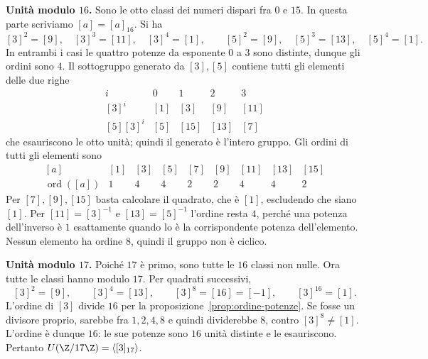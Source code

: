 \begin{svolgimento}
\textbf{Unità modulo $16$.} Sono le otto classi dei numeri dispari fra $0$ e $15$. In questa parte scriviamo $[a]=[a]_{16}$. Si ha
\[
[3]^2=[9],\quad[3]^3=[11],\quad[3]^4=[1],\qquad
[5]^2=[9],\quad[5]^3=[13],\quad[5]^4=[1].
\]
In entrambi i casi le quattro potenze da esponente $0$ a $3$ sono distinte, dunque gli ordini sono $4$. Il sottogruppo generato da $[3],[5]$ contiene tutti gli elementi delle due righe
\[
\begin{array}{c|rrrr}
i&0&1&2&3\\\hline
[3]^i &[1]&[3]&[9]&[11]\\
{[5][3]^i} &[5]&[15]&[13]&[7]
\end{array}
\]
che esauriscono le otto unità; quindi il generato è l'intero gruppo. Gli ordini di tutti gli elementi sono
\[
\begin{array}{c|rrrrrrrr}
[a]&[1]&[3]&[5]&[7]&[9]&[11]&[13]&[15]\\\hline
\operatorname{ord}([a])&1&4&4&2&2&4&4&2
\end{array}
\]
Per $[7],[9],[15]$ basta calcolare il quadrato, che è $[1]$, escludendo che siano $[1]$. Per $[11]=[3]^{-1}$ e $[13]=[5]^{-1}$ l'ordine resta $4$, perché una potenza dell'inverso è $1$ esattamente quando lo è la corrispondente potenza dell'elemento. Nessun elemento ha ordine $8$, quindi il gruppo non è ciclico.

\textbf{Unità modulo $17$.} Poiché $17$ è primo, sono tutte le $16$ classi non nulle. Ora tutte le classi hanno modulo $17$. Per quadrati successivi,
\[
[3]^2=[9],\qquad[3]^4=[13],\qquad[3]^8=[16]=[-1],\qquad[3]^{16}=[1].
\]
L'ordine di $[3]$ divide $16$ per la proposizione~\ref{prop:ordine-potenze}. Se fosse un divisore proprio, sarebbe fra $1,2,4,8$ e quindi dividerebbe $8$, contro $[3]^8\ne[1]$. L'ordine è dunque $16$: le sue potenze sono $16$ unità distinte e le esauriscono. Pertanto $U(\Z/17\Z)=\langle[3]_{17}\rangle$.
\end{svolgimento}
